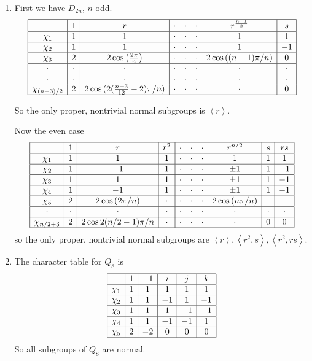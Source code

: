 \documentclass[11pt]{article}
\begin{document}
\begin{enumerate}
\item First we have $D_{2n}$, $n$ odd.
\[\begin{array}{|c|c|c|cccc|c|}
\hline
&1&r&\cdot&\cdot&\cdot&r^{\frac{n-1}{2}}&s\\
\hline
\chi_1&1&1&\cdot&\cdot&\cdot&1&1\\
\hline
\chi_2&1&1&\cdot&\cdot&\cdot&1&-1\\
\hline
\chi_3&2&2 \cos{\left(\frac{2 \pi }{ n}\right)}&\cdot&\cdot&\cdot&2 \cos{((n-1) \pi / n)}&0\\
\hline
\cdot&\cdot&\cdot&\cdot&\cdot&\cdot&\cdot&\cdot\\
\cdot&\cdot&\cdot&\cdot&\cdot&\cdot&\cdot&\cdot\\
\chi_{(n+3)/2}&2&2\cos{(2(\frac{n+3}{12} -2)\pi/n)}&\cdot&\cdot&\cdot&\cdot&0\\
\hline
\end{array}\]

So the only proper, nontrivial normal subgroups is $\left<r\right>$.

Now the even case
\[\begin{array}{|c|c|c|c|cccc|c|c|}
\hline
&1&r&r^2&\cdot&\cdot&\cdot&r^{n/2}&s&rs\\
\hline
\chi_1&1&1&1&\cdot&\cdot&\cdot&1&1&1\\
\hline
\chi_2&1&-1&1&\cdot&\cdot&\cdot&\pm1&1&-1\\
\hline
\chi_3&1&1&1&\cdot&\cdot&\cdot&\pm1&1&-1\\
\hline
\chi_4&1&-1&1&\cdot&\cdot&\cdot&\pm1&1&-1\\
\hline
\chi_{5}&2&2\cos{(2\pi/n)}&\cdot&\cdot&\cdot&\cdot&2 \cos{(n \pi /n)}&&\\
\hline
\cdot&\cdot&\cdot&\cdot&\cdot&\cdot&\cdot&\cdot&\cdot&\cdot\\
\hline
\chi_{n/2 + 3} & 2 & 2 \cos{2(n/2-1) \pi / n}&\cdot&\cdot&\cdot&\cdot&\cdot&0&0\\
\hline
\end{array}\]
so the only proper, nontrivial normal subgroups are $\left<r\right>,\left<r^2, s\right>,\left<r^2, rs\right>$.

\item
The character table for $Q_8$ is
 \[\begin{array}{|c|c|c|c|c|c|}
\hline
&1&-1&i&j&k\\
\hline
\chi_1&1&1&1&1&1\\
\hline
\chi_2&1&1&-1&1&-1\\
\hline
\chi_3&1&1&1&-1&-1\\
\hline
\chi_4&1&1&-1&-1&1\\
\hline
\chi_5&2&-2&0&0&0\\
\hline
\end{array}\]
So all subgroups of $Q_8$ are normal.


\end{enumerate}
\end{document}
